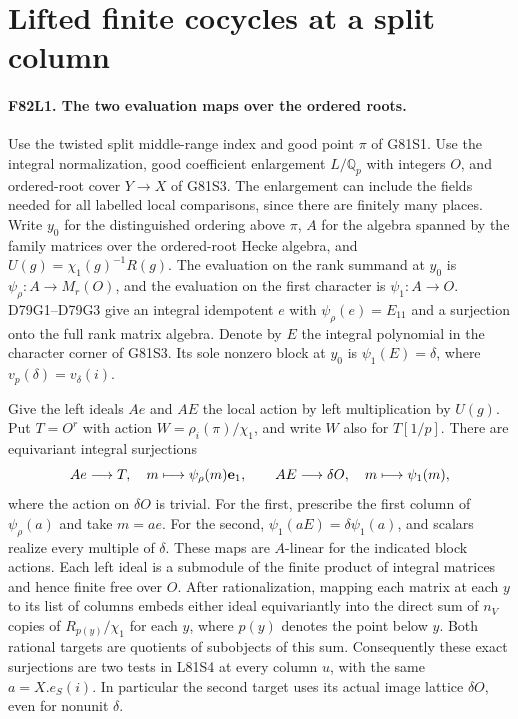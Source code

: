 \section{Lifted finite cocycles at a split column}

\paragraph{F82L1. The two evaluation maps over the ordered roots.}
Use the twisted split middle-range index and good point $\pi$ of
G81S1. Use the integral normalization, good coefficient enlargement
$L/\mathbb Q_p$ with integers $O$, and ordered-root cover $Y\to X$
of G81S3. The enlargement can include the fields needed for all
labelled local comparisons, since there are finitely many places.
Write $y_0$ for the distinguished ordering above $\pi$, $A$ for
the algebra spanned by the family matrices over the ordered-root
Hecke algebra, and $U(g)=\chi_1(g)^{-1}R(g)$.
The evaluation on the rank summand at $y_0$ is
$\psi_\rho:A\to M_r(O)$, and the evaluation on the first
character is $\psi_1:A\to O$. D79G1--D79G3 give an integral
idempotent $e$ with $\psi_\rho(e)=E_{11}$ and a surjection onto
the full rank matrix algebra. Denote by $E$ the integral polynomial
in the character corner of G81S3. Its sole nonzero block at $y_0$
is $\psi_1(E)=\delta$, where $v_p(\delta)=v_\delta(i)$.

Give the left ideals $Ae$ and $AE$ the local action by left
multiplication by $U(g)$. Put $T=O^r$ with action
$W=\rho_i(\pi)/\chi_1$, and write $W$ also for $T[1/p]$.
There are equivariant integral surjections
\[
 Ae\longrightarrow T,\quad m\longmapsto\psi_\rho(m){\bf e}_1,
 \qquad
 AE\longrightarrow\delta O,\quad m\longmapsto\psi_1(m),
\]
where the action on $\delta O$ is trivial. For the first, prescribe
the first column of $\psi_\rho(a)$ and take $m=ae$.
For the second, $\psi_1(aE)=\delta\psi_1(a)$, and scalars
realize every multiple of $\delta$. These maps are $A$-linear for
the indicated block actions. Each left ideal is a submodule of
the finite product of integral matrices and hence finite free
over $O$. After rationalization, mapping each matrix at each
$y$ to its list of columns embeds either ideal equivariantly into
the direct sum of $n_V$ copies of $R_{p(y)}/\chi_1$ for each $y$,
where $p(y)$ denotes the point below $y$. Both rational targets
are quotients of subobjects of this sum. Consequently these exact
surjections are two tests in L81S4 at every column $u$, with
the same $a=X.e_S(i)$. In particular the second target uses its
actual image lattice $\delta O$, even for nonunit $\delta$.

